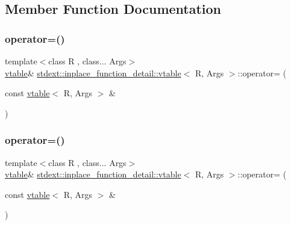 \subsection{Member Function Documentation}
\mbox{\label{structstdext_1_1inplace__function__detail_1_1vtable_a237004dd36c2a7b4b76bf94dec827fbd}} 
\subsubsection{\texorpdfstring{operator=()}{operator=()}\hspace{0.1cm}{\footnotesize\ttfamily [1/4]}}
{\footnotesize\ttfamily template$<$class R , class... Args$>$ \\
\hyperlink{structstdext_1_1inplace__function__detail_1_1vtable}{vtable}\& \hyperlink{structstdext_1_1inplace__function__detail_1_1vtable}{stdext\+::inplace\+\_\+function\+\_\+detail\+::vtable}$<$ R, Args $>$\+::operator= (\begin{DoxyParamCaption}\item[{const \hyperlink{structstdext_1_1inplace__function__detail_1_1vtable}{vtable}$<$ R, Args $>$ \&}]{ }\end{DoxyParamCaption})\hspace{0.3cm}{\ttfamily [delete]}}

\mbox{\label{structstdext_1_1inplace__function__detail_1_1vtable_a237004dd36c2a7b4b76bf94dec827fbd}} 
\subsubsection{\texorpdfstring{operator=()}{operator=()}\hspace{0.1cm}{\footnotesize\ttfamily [2/4]}}
{\footnotesize\ttfamily template$<$class R , class... Args$>$ \\
\hyperlink{structstdext_1_1inplace__function__detail_1_1vtable}{vtable}\& \hyperlink{structstdext_1_1inplace__function__detail_1_1vtable}{stdext\+::inplace\+\_\+function\+\_\+detail\+::vtable}$<$ R, Args $>$\+::operator= (\begin{DoxyParamCaption}\item[{const \hyperlink{structstdext_1_1inplace__function__detail_1_1vtable}{vtable}$<$ R, Args $>$ \&}]{ }\end{DoxyParamCaption})\hspace{0.3cm}{\ttfamily [delete]}}

